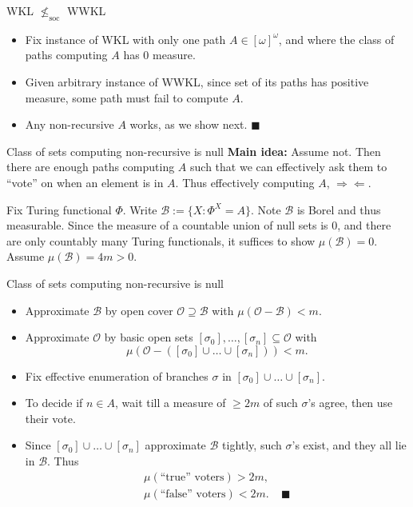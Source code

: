 \begin{frame}{WKL $\nleq_{\text{soc}}$ WWKL}
  \begin{itemize}
    \item Fix instance of WKL with only one path $A\in[\omega]^\omega$, and
      where the class of paths computing $A$ has 0 measure.
    \item Given arbitrary instance of WWKL, since set of its paths has
      positive measure, some path must fail to compute $A$.
    \item Any non-recursive $A$ works, as we show next.
      $\blacksquare$
  \end{itemize}
\end{frame}

\begin{frame}{Class of sets computing non-recursive is null}
  \textbf{Main idea:} Assume not. Then there are enough paths computing
  $A$ such that we can effectively ask them to ``vote''
  on when an element is in $A$. Thus effectively computing
  $A$, $\Rightarrow\Leftarrow$.
  \vspace{1em}

  Fix Turing functional $\Phi$. Write $\mathcal{B} :=\{X:
  \Phi^X=A\}$. Note $\mathcal{B}$ is Borel and thus measurable.
  Since the measure of a countable union of null sets is 0, and
  there are only countably many Turing functionals, it suffices to show
  $\mu(\mathcal{B})=0$. Assume $\mu(\mathcal{B})=4m>0$.
\end{frame}

\begin{frame}{Class of sets computing non-recursive is null}
  \begin{itemize}
    \item Approximate $\mathcal{B}$ by open cover
      $\mathcal{O}\supseteq\mathcal{B}$ with
      $\mu(\mathcal{O}-\mathcal{B})<m$.
    \item Approximate $\mathcal{O}$ by basic open sets
      $[\sigma_0],\ldots,[\sigma_n] \subseteq\mathcal{O}$ with
      \[\mu(\mathcal{O}-([\sigma_0]\cup\ldots\cup[\sigma_n])) <m.\]
    \item Fix effective enumeration of branches $\sigma$ in
      $[\sigma_0]\cup\ldots\cup[\sigma_n]$.
    \item To decide if $n\in A$, wait till a measure of $\geq2m$ of such
      $\sigma$'s agree, then use their vote.
    \item Since $[\sigma_0]\cup\ldots\cup[\sigma_n]$ approximate
      $\mathcal{B}$ tightly, such $\sigma$'s exist, and they all lie in
      $\mathcal{B}$. Thus
      \begin{align*}
        \mu(\text{``true'' voters})>2m,\\
        \mu(\text{``false'' voters})<2m. &\;\blacksquare
      \end{align*}
  \end{itemize}
\end{frame}

